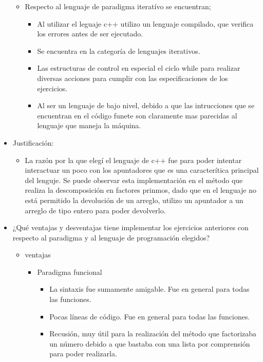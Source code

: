 \documentclass[10pt]{article}
\begin{document}
\begin{titlepage}
\begin{flushleft}
\begin{itemize}
\begin{itemize}
				\item Respecto al lenguaje de paradigma iteratívo se encuentran;
					\begin{itemize}
						\item Al utilizar el leguaje c++ utilizo un lenguaje compilado, que verifica
						los errores antes de ser ejecutado.
						\item Se encuentra en la categoría de lenguajes iterativos.
						\item Las estructuras de control en especial el ciclo while para realizar diversas acciones para cumplir con las especificaciones de los ejercicios.
						\item Al ser un lenguaje de bajo nivel, debido a que las intrucciones que se encuentran en el código funete son claramente mas parecidas al lenguaje que maneja la máquina.
					\end{itemize}
			
			\end{itemize}
			
			\item Justificación:
			\begin{itemize}
				\item La razón por la que elegí el lenguaje de c++ fue para poder intentar interactuar un poco con los apuntadores que es una caracterítica principal del lenguje. Se puede observar esta implementación en el método que realiza la descomposición en factores prinmos, dado que en el lenguaje no está permitido la devolución de un arreglo, utilizo un apuntador a un arreglo de tipo entero para poder devolverlo.
			\end{itemize}

			\item ¿Qué ventajas y desventajas tiene implementar los ejercicios anteriores con respecto al paradigma y al lenguaje de programación elegidos?

			\begin{itemize}
				\item ventajas
					\begin{itemize}
						
						\item Paradigma funcional
						\begin{itemize}
							\item La sintaxis fue sumamente amigable. Fue en general para todas las funciones.
							\item Pocas líneas de código. Fue en general para todas las funciones.
							\item Recusión, muy útil para la realización del método que factorizaba un número debido a que bastaba con una lista por comprensión para poder realizarla.
						\end{itemize}


\end{itemize}
\end{itemize}
\end{itemize}
\end{flushleft}
\end{titlepage}
\end{document}
